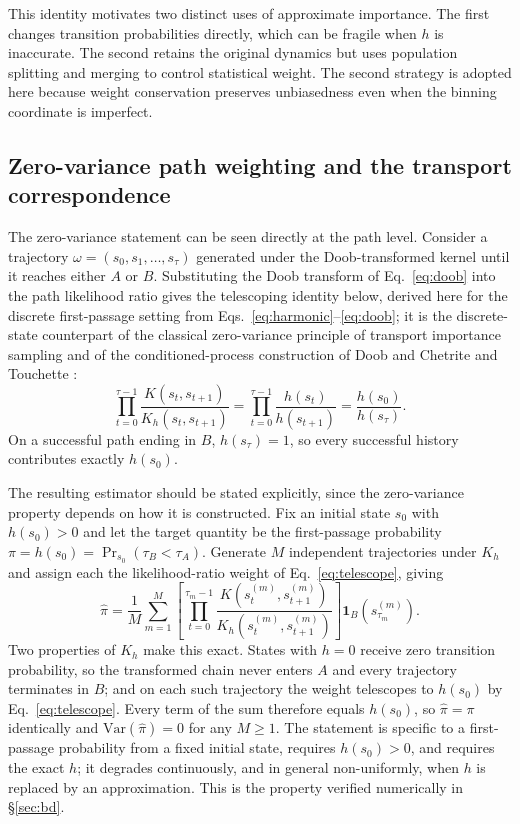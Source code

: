\documentclass[a4paper,fleqn]{cas-sc}
\begin{document}
This identity motivates two distinct uses of approximate importance. The first changes
transition probabilities directly, which can be fragile when $h$ is inaccurate. The second
retains the original dynamics but uses population splitting and merging to control
statistical weight. The second strategy is adopted here because weight conservation
preserves unbiasedness even when the binning coordinate is imperfect.

\subsection{Zero-variance path weighting and the transport correspondence}\label{sec:zerovar}
The zero-variance statement can be seen directly at the path level. Consider a trajectory
$\omega=(s_0,s_1,\dots,s_\tau)$ generated under the Doob-transformed kernel until it reaches
either $A$ or $B$. Substituting the Doob transform of Eq.~\eqref{eq:doob} into the path
likelihood ratio gives the telescoping identity below, derived here for the discrete
first-passage setting from Eqs.~\eqref{eq:harmonic}--\eqref{eq:doob}; it is the discrete-state
counterpart of the classical zero-variance principle of transport importance sampling
\citep{lewins1965,spanier1969,haghighat2003} and of the conditioned-process construction of
Doob \citep{doob1984} and Chetrite and Touchette \citep{chetrite2015}:
\begin{equation}
\prod_{t=0}^{\tau-1}\frac{K(s_t,s_{t+1})}{K_h(s_t,s_{t+1})}
=\prod_{t=0}^{\tau-1}\frac{h(s_t)}{h(s_{t+1})}
=\frac{h(s_0)}{h(s_\tau)} .
\label{eq:telescope}
\end{equation}
On a successful path ending in $B$, $h(s_\tau)=1$, so every successful history contributes
exactly $h(s_0)$.

The resulting estimator should be stated explicitly, since the zero-variance property depends
on how it is constructed. Fix an initial state $s_0$ with $h(s_0)>0$ and let the target
quantity be the first-passage probability $\pi=h(s_0)=\Pr_{s_0}(\tau_B<\tau_A)$. Generate $M$
independent trajectories under $K_h$ and assign each the likelihood-ratio weight of
Eq.~\eqref{eq:telescope}, giving
\begin{equation}
\hat\pi=\frac1M\sum_{m=1}^{M}
\left[\prod_{t=0}^{\tau_m-1}\frac{K(s_t^{(m)},s_{t+1}^{(m)})}{K_h(s_t^{(m)},s_{t+1}^{(m)})}\right]
\mathbf 1_B\!\left(s_{\tau_m}^{(m)}\right).
\label{eq:zvest}
\end{equation}
Two properties of $K_h$ make this exact. States with $h=0$ receive zero transition probability,
so the transformed chain never enters $A$ and every trajectory terminates in $B$; and on each
such trajectory the weight telescopes to $h(s_0)$ by Eq.~\eqref{eq:telescope}. Every term of
the sum therefore equals $h(s_0)$, so $\hat\pi=\pi$ identically and
$\mathrm{Var}(\hat\pi)=0$ for any $M\ge1$. The statement is specific to a first-passage
probability from a fixed initial state, requires $h(s_0)>0$, and requires the exact $h$; it
degrades continuously, and in general non-uniformly, when $h$ is replaced by an approximation.
This is the property verified numerically in \S\ref{sec:bd}.
\end{document}
